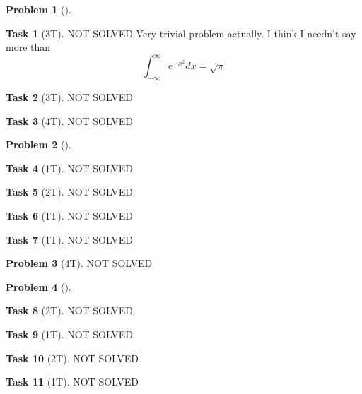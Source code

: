 \documentclass[11pt,twoside]{article}
\theoremstyle{definition}
\newtheorem{amsproblem}{Problem}
\newtheorem{amssubproblem}{Task}[amsproblem]
\newenvironment{problem}[1][]{%
  \begin{amsproblem}[#1]
  }{%
  \end{amsproblem}
}
\newenvironment{subproblem}[1][]{%
  \begin{amssubproblem}[#1]
  }{%
  \end{amssubproblem}
}
\newcommand{\TP}[1]{#1T}
\begin{document}
\begin{problem}
  \begin{subproblem}[\TP{3}]
    NOT SOLVED %
    Very trivial problem actually. I think I needn't say more than 
    \[
			\int_{-\infty}^{\infty}e^{-x^2}dx = \sqrt\pi    
    \]
  \end{subproblem}
  \begin{subproblem}[\TP{3}]
    NOT SOLVED %
  \end{subproblem}
  \begin{subproblem}[\TP{4}]
    NOT SOLVED %
  \end{subproblem}
\end{problem}

\noindent
\hrulefill

\begin{problem}
  \begin{subproblem}[\TP{1}]
    NOT SOLVED %
  \end{subproblem}
  \begin{subproblem}[\TP{2}]
    NOT SOLVED %
  \end{subproblem}
  \begin{subproblem}[\TP{1}]
    NOT SOLVED %
  \end{subproblem}
  \begin{subproblem}[\TP{1}]
    NOT SOLVED %
  \end{subproblem}
\end{problem}

\noindent
\hrulefill

\begin{problem}[\TP{4}]
  NOT SOLVED %
\end{problem}

\noindent
\hrulefill

\begin{problem}
  \begin{subproblem}[\TP{2}]
    NOT SOLVED %
  \end{subproblem}
  \begin{subproblem}[\TP{1}]
    NOT SOLVED %
  \end{subproblem}
  \begin{subproblem}[\TP{2}]
    NOT SOLVED %
  \end{subproblem}
  \begin{subproblem}[\TP{1}]
    NOT SOLVED %
  \end{subproblem}
\end{problem}
\end{document}
